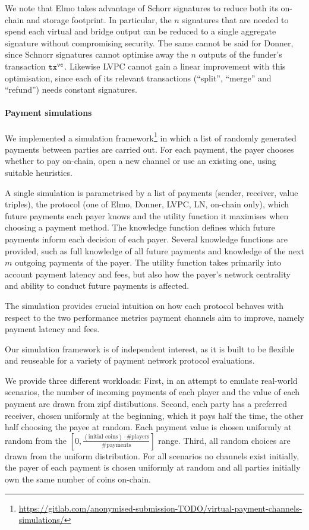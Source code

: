   We note that Elmo takes advantage of Schorr signatures to reduce both its
  on-chain and storage footprint. In particular, the $n$ signatures that are
  needed to spend each virtual and bridge output can be reduced to a single
  aggregate signature without compromising security. The same cannot be said for
  Donner, since Schnorr signatures cannot optimise away the $n$ outputs of the
  funder's transaction $\texttt{tx}^{\mathtt{vc}}$. Likewise LVPC cannot gain a linear
  improvement with this optimisation, since each of its relevant transactions
  (``split'', ``merge'' and ``refund'') needs constant signatures.

  \paragraph{Payment simulations} We implemented a simulation
  framework\footnote{\url{https://gitlab.com/anonymised-submission-TODO/virtual-payment-channels-simulations/}}
  in which a list of randomly generated payments between parties are carried
  out. For each payment, the payer chooses whether to pay on-chain,
  open a new channel or use an existing one, using suitable heuristics.

  A single simulation is parametrised by a list of payments (sender, receiver,
  value triples), the protocol (one of Elmo, Donner, LVPC, LN, on-chain only),
  which future payments each payer knows and the utility function it maximises
  when choosing a payment method. The knowledge function defines which future
  payments inform each decision of each payer. Several knowledge functions are
  provided, such as full knowledge of all future payments and knowledge of the
  next $m$ outgoing payments of the payer. The utility function takes primarily
  into account payment latency and fees, but also how the payer's network
  centrality and ability to conduct future payments is affected.

  The simulation provides crucial intuition on how each protocol behaves with
  respect to the two performance metrics payment channels aim to improve, namely
  payment latency and fees.

  Our simulation framework is of independent interest, as it is built to be
  flexible and reuseable for a variety of payment network protocol evaluations.

  We provide three different workloads: First, in an attempt to emulate
  real-world scenarios, the number of incoming payments of each player and the
  value of each payment are drawn from zipf  distibutions.
  Second, each party has a preferred receiver, chosen uniformly at the
  beginning, which it pays half the time, the other half choosing the payee at
  random. Each payment value is chosen uniformly at random from the $[0,
  \frac{(\text{initial coins}) \cdot \text{\#players}}{\text{\#payments}}]$
  range. Third, all random choices are drawn from the uniform distribution. For
  all scenarios no channels exist initially, the payer of each payment is chosen
  uniformly at random and all parties initially own the same number of coins
  on-chain.

